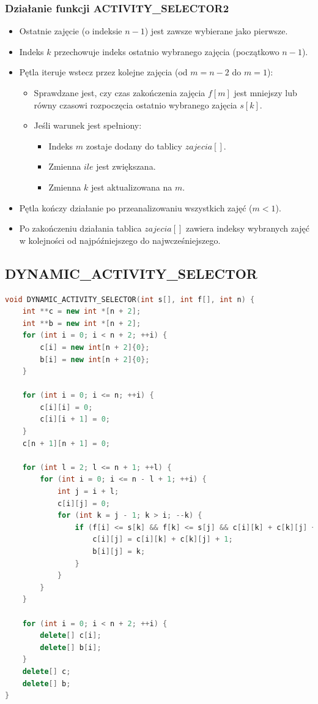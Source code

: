 \documentclass{article}
\begin{document}
		\subsubsection*{Działanie funkcji ACTIVITY\_SELECTOR2}
		\begin{itemize}
			\item Ostatnie zajęcie (o indeksie $n-1$) jest zawsze wybierane jako pierwsze.
			\item Indeks $k$ przechowuje indeks ostatnio wybranego zajęcia (początkowo $n-1$).
			\item Pętla iteruje wstecz przez kolejne zajęcia (od $m = n-2$ do $m = 1$):
			\begin{itemize}
				\item Sprawdzane jest, czy czas zakończenia zajęcia $f[m]$ jest mniejszy lub równy czasowi rozpoczęcia ostatnio wybranego zajęcia $s[k]$.
				\item Jeśli warunek jest spełniony:
				\begin{itemize}
					\item Indeks $m$ zostaje dodany do tablicy $zajecia[]$.
					\item Zmienna $ile$ jest zwiększana.
					\item Zmienna $k$ jest aktualizowana na $m$.
				\end{itemize}
			\end{itemize}
			\item Pętla kończy działanie po przeanalizowaniu wszystkich zajęć ($m < 1$).
			\item Po zakończeniu działania tablica $zajecia[]$ zawiera indeksy wybranych zajęć w kolejności od najpóźniejszego do najwcześniejszego.
		\end{itemize}
	
	\subsection*{DYNAMIC\_ACTIVITY\_SELECTOR} 
	\begin{lstlisting}[language=C++, tabsize=3, basicstyle=\footnotesize]
void DYNAMIC_ACTIVITY_SELECTOR(int s[], int f[], int n) {
	int **c = new int *[n + 2];
	int **b = new int *[n + 2];
	for (int i = 0; i < n + 2; ++i) {
		c[i] = new int[n + 2]{0};
		b[i] = new int[n + 2]{0};
	}
	
	for (int i = 0; i <= n; ++i) {
		c[i][i] = 0;
		c[i][i + 1] = 0;
	}
	c[n + 1][n + 1] = 0;
	
	for (int l = 2; l <= n + 1; ++l) {
		for (int i = 0; i <= n - l + 1; ++i) {
			int j = i + l;
			c[i][j] = 0;
			for (int k = j - 1; k > i; --k) {
				if (f[i] <= s[k] && f[k] <= s[j] && c[i][k] + c[k][j] + 1 > c[i][j]) {
					c[i][j] = c[i][k] + c[k][j] + 1;
					b[i][j] = k;
				}
			}
		}
	}
	
	for (int i = 0; i < n + 2; ++i) {
		delete[] c[i];
		delete[] b[i];
	}
	delete[] c;
	delete[] b;
}

	\end{lstlisting}
		
\end{document}
